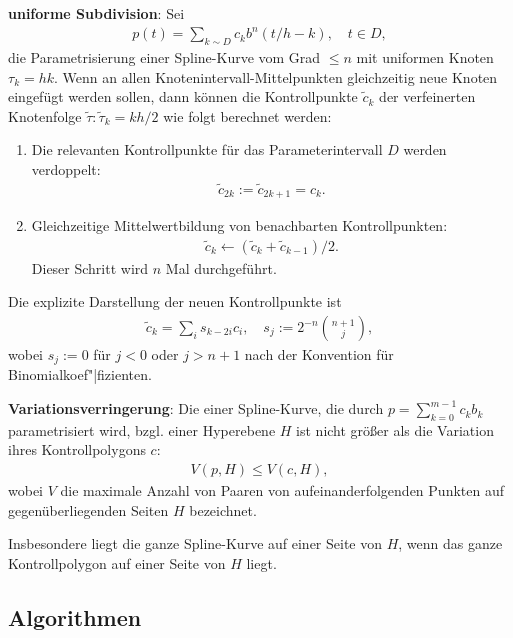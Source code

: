 \linie

\textbf{uniforme Subdivision}:
Sei
\begin{align*}
    p(t) = \sum_{k \sim D} c_k b^n(t/h - k),\quad t \in D,
\end{align*}
die Parametrisierung einer Spline-Kurve vom Grad $\le n$ mit uniformen Knoten $\tau_k = hk$.
Wenn an allen Knotenintervall-Mittelpunkten gleichzeitig neue Knoten eingefügt werden sollen,
dann können die Kontrollpunkte $\widetilde{c}_k$ der verfeinerten Knotenfolge
$\widetilde{\tau}\colon \widetilde{\tau}_k = kh/2$ wie folgt berechnet werden:
\begin{enumerate}
    \item
    Die relevanten Kontrollpunkte für das Parameterintervall $D$ werden verdoppelt:
    \begin{align*}
        \widetilde{c}_{2k} := \widetilde{c}_{2k+1} = c_k.
    \end{align*}
    
    \item
    Gleichzeitige Mittelwertbildung von benachbarten Kontrollpunkten:
    \begin{align*}
        \widetilde{c}_k \leftarrow (\widetilde{c}_k + \widetilde{c}_{k-1})/2.
    \end{align*}
    Dieser Schritt wird $n$ Mal durchgeführt.
\end{enumerate}
Die explizite Darstellung der neuen Kontrollpunkte ist
\begin{align*}
    \widetilde{c}_k = \sum_i s_{k-2i} c_i,\quad
    s_j := 2^{-n} \binom{n + 1}{j},
\end{align*}
wobei $s_j := 0$ für $j < 0$ oder $j > n + 1$ nach der Konvention für Binomialkoef"|fizienten.

\linie
\pagebreak

\textbf{Variationsverringerung}:
Die  einer Spline-Kurve, die durch $p = \sum_{k=0}^{m-1} c_k b_k$
parametrisiert wird, bzgl. einer Hyperebene $H$ ist nicht größer als die Variation
ihres Kontrollpolygons $c$:
\begin{align*}
    V(p, H) \le V(c, H),
\end{align*}
wobei $V$ die maximale Anzahl von Paaren von aufeinanderfolgenden Punkten auf gegenüberliegenden
Seiten $H$ bezeichnet.

Insbesondere liegt die ganze Spline-Kurve auf einer Seite von $H$, wenn das
ganze Kontrollpolygon auf einer Seite von $H$ liegt.

\subsection{%
    Algorithmen%
}


